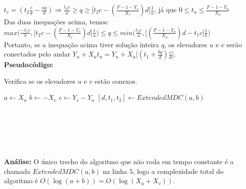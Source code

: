 $t_v = (t_2\frac{c}{d} - \frac{aq}{d}) \Rightarrow \frac{t_2c}{a} \geq q \geq \big[t_2c - (\frac{F-1-Y_v}{X_v})d\big]\frac{1}{a}$, já que $0\leq t_u\leq \frac{F-1-Y_u}{X_u}$
\\

Das duas inequações acima, temos:
\\

$max\Big(\frac{-t_1c}{b}, \big[t_2c - (\frac{F-1-Y_v}{X_v})d\big]\frac{1}{a} \Big) \leq q \leq min\Big(\frac{t_2c}{a}, \big[(\frac{F-1-Y_u}{X_u})d - t_1c\big]\frac{1}{b}  \Big)$
\\

Portanto, se a inequação acima tiver solução inteira $q$, os elevadores $u$ e $v$ serão conectados pelo andar $Y_u+X_ut_u = Y_u+X_u\big[(t_1 + \frac{bq}{d})\frac{c}{d}\big]$.
\\

\textbf{Pseudocódigo:}
\begin{algorithm}
\caption{Verifica se os elevadores $u$ e $v$ estão conexos.}\label{euclid}
\begin{algorithmic}[1]
\State $a \gets X_u$
\State $b \gets -X_v$
\State $c \gets Y_v-Y_u$
\State $[d,t_1,t_2] \gets ExtendedMDC(a,b)$
\\
\State {}
\EndIf
\\
\State {}
\EndIf
\\
\\
\\
\State {}
\EndIf
\\
\State {}

\EndProcedure
\end{algorithmic}
\end{algorithm}

\textbf{Análise:}
O único trecho do algoritmo que não roda em tempo constante é a chamada $ExtendedMDC(a,b)$ na linha $5$, logo a complexidade total do algoritmo é $O(\log(a+b)) = O(\log(X_u+X_v))$.
